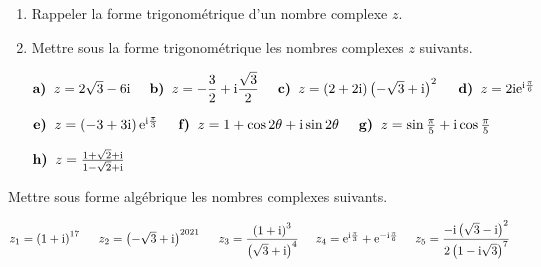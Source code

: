 
\everymath{\displaystyle}



\begin{exercice}
\begin{enumerate}
\item Rappeler la forme trigonométrique d'un nombre complexe $ z $.
\item Mettre  sous la  forme trigonométrique les nombres complexes $ z $ suivants.

 $\textbf{a)} \;\;z=2\sqrt{3}-6\text{i}
\hspace*{0.5cm}\textbf{b)} \;\;  z=-\dfrac{3}{2}+\text{i}\dfrac{\sqrt{3}}{2} \hspace*{0.5cm}\textbf{c)} \;\; z=\left(2+2\text{i}\right)\left(-\sqrt{3}+\text{i}\right)^2
\hspace*{0.5cm}\textbf{d)} \;\; z=2\text{i}\mathrm{e}^{\text{i}\frac{\pi}{6}} $
\medskip

 $\textbf{e)} \;\;z=\left(-3+3\text{i}\right)\mathrm{e}^{\text{i}\frac{\pi}{3}}
\hspace*{0.5cm}\textbf{f)} \;\;  z=1+\cos 2\theta +\text{i}\sin 2\theta \hspace*{0.5cm}\textbf{g)} \;\; z=\sin \frac{\pi}{5} +\text{i}\cos \frac{\pi}{5}$

$\textbf{h)} \;\; z=\frac{1+\sqrt{2}+\text{i}}{1-\sqrt{2}+\text{i}} $

\end{enumerate}
\end{exercice}

\begin{exercice}
Mettre sous forme algébrique les nombres complexes suivants.
\medskip

 $  z_1=\left(1+\text{i}\right)^{17}
\hspace*{0.5cm}  z_2=\left(-\sqrt{3}+\text{i}\right)^{2021}  \hspace*{0.5cm}  z_3=\dfrac{\left(1+\text{i}\right)^{3}}{\left(\sqrt{3}+\text{i}\right)^{4}} \hspace*{0.5cm} z_4=\mathrm{e}^{\text{i}\frac{\pi}{3}}+\mathrm{e}^{-\text{i}\frac{\pi}{6}} \hspace*{0.5cm} z_5=\dfrac{-\text{i}\left(\sqrt{3}-\text{i}\right)^{2}}{2\left(1-\text{i}\sqrt{3}\right)^{7}}$

\end{exercice}


